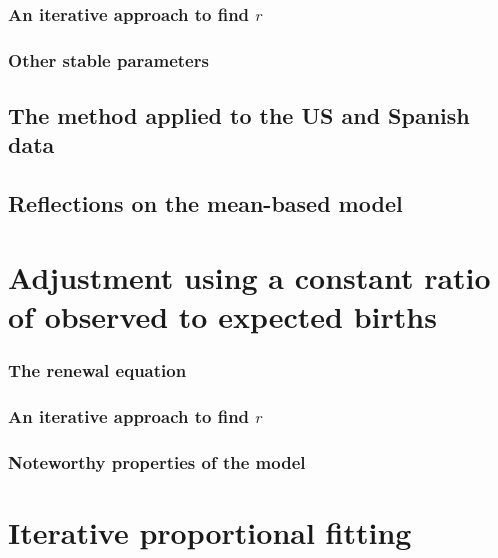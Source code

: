       \subsection{An iterative approach to find $r$}
         
      \subsection{Other stable parameters}
         
      \section{The method applied to the US and Spanish data}
        
      \section{Reflections on the mean-based model}
        
        
  \chapter{Adjustment using a constant ratio of observed to expected births}
      
    \subsection{The renewal equation}
      
 
    \subsection{An iterative approach to find $r$}
      
      
    \subsection{Noteworthy properties of the model}
      
  
  \chapter{Iterative proportional fitting}
      

